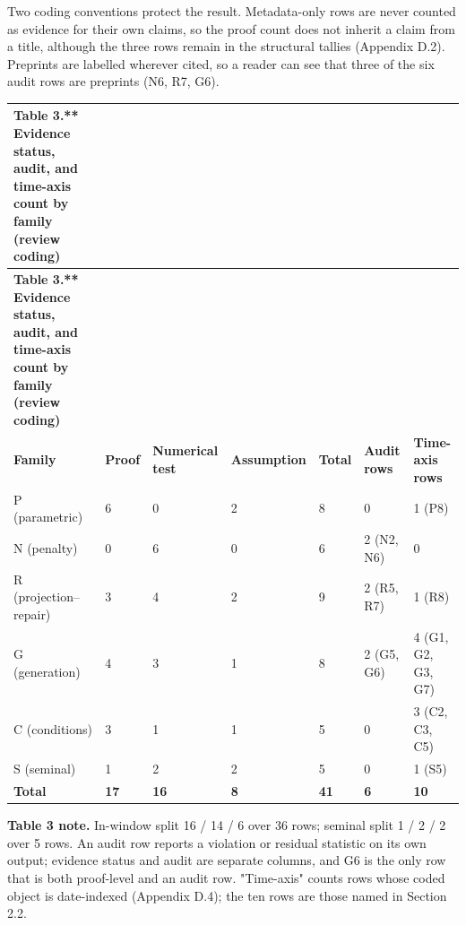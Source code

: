 \documentclass[11pt]{article}
\begin{document}
Two coding conventions protect the result. Metadata-only rows are never counted as evidence for their own claims, so the proof count does not inherit a claim from a title, although the three rows remain in the structural tallies (Appendix D.2). Preprints are labelled wherever cited, so a reader can see that three of the six audit rows are preprints (N6, R7, G6).

\begingroup\scriptsize
\begin{longtable}{@{}p{}p{}p{}p{}p{}p{}p{}@{}}
\toprule
\textbf{Table 3.** Evidence status, audit, and time-axis count by family (review coding)} & \textbf{} & \textbf{} & \textbf{} & \textbf{} & \textbf{} & \textbf{} \\
\midrule
\endfirsthead
\toprule
\textbf{Table 3.** Evidence status, audit, and time-axis count by family (review coding)} & \textbf{} & \textbf{} & \textbf{} & \textbf{} & \textbf{} & \textbf{} \\
\midrule
\endhead
\textbf{Family} & \textbf{Proof} & \textbf{Numerical test} & \textbf{Assumption} & \textbf{Total} & \textbf{Audit rows} & \textbf{Time-axis rows} \\
P (parametric) & 6 & 0 & 2 & 8 & 0 & 1 (P8) \\
N (penalty) & 0 & 6 & 0 & 6 & 2 (N2, N6) & 0 \\
R (projection–repair) & 3 & 4 & 2 & 9 & 2 (R5, R7) & 1 (R8) \\
G (generation) & 4 & 3 & 1 & 8 & 2 (G5, G6) & 4 (G1, G2, G3, G7) \\
C (conditions) & 3 & 1 & 1 & 5 & 0 & 3 (C2, C3, C5) \\
S (seminal) & 1 & 2 & 2 & 5 & 0 & 1 (S5) \\
\textbf{Total} & \textbf{17} & \textbf{16} & \textbf{8} & \textbf{41} & \textbf{6} & \textbf{10} \\
\bottomrule
\end{longtable}
\endgroup

\textbf{Table 3 note.} In-window split 16 / 14 / 6 over 36 rows; seminal split 1 / 2 / 2 over 5 rows. An audit row reports a violation or residual statistic on its own output; evidence status and audit are separate columns, and G6 is the only row that is both proof-level and an audit row. "Time-axis" counts rows whose coded object is date-indexed (Appendix D.4); the ten rows are those named in Section 2.2.
\end{document}
